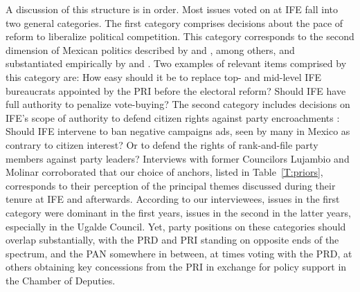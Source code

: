 \documentclass[12 pt, letter]{article}
\begin{document}
A discussion of this structure is in order. Most issues voted on at
IFE fall into two general categories. The first category comprises
decisions about the pace of reform to liberalize political
competition. This category corresponds to the second dimension of
Mexican politics described by \citet{Molinar1991} and
\citet{Lujambio2001}, among others, and substantiated empirically by
\citet{Moreno2003a} and \citet{Magaloni2006}.  Two examples of
relevant items comprised by this category are: How easy should it be
to replace top- and mid-level IFE bureaucrats appointed by the PRI
before the electoral reform? Should IFE have full authority to
penalize vote-buying?  The second category includes decisions on
IFE's scope of authority to defend citizen rights against party
encroachments \citep[cf.][]{Cardenas2004}: Should IFE intervene to
ban negative campaigns ads, seen by many in Mexico as contrary to
citizen interest? Or to defend the rights of rank-and-file party
members against party leaders? Interviews with former Councilors
Lujambio and Molinar corroborated that our choice of anchors, listed
in Table~\ref{T:priors}, corresponds  to their perception of the
principal themes discussed during their tenure at IFE and
afterwards.  According to our interviewees, issues in the first
category were dominant in the first years, issues in the second in
the latter years, especially in the Ugalde Council. Yet, party
positions on these  categories should overlap substantially, with
the PRD and PRI standing on opposite ends of the spectrum, and the
PAN somewhere in between, at times voting with the PRD, at others
obtaining key concessions from the PRI in exchange for policy
support in the Chamber of Deputies.

\end{document}

